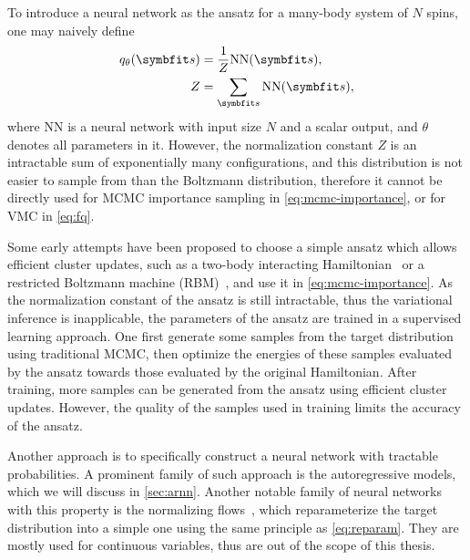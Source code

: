 To introduce a neural network as the ansatz for a many-body system of $N$ spins, one may naively define
\begin{align}
q_\theta(\vs) &= \frac{1}{Z} \text{NN}(\vs), \\
Z &= \sum_\vs \text{NN}(\vs),
\end{align}
where NN is a neural network with input size $N$ and a scalar output, and $\theta$ denotes all parameters in it. However, the normalization constant $Z$ is an intractable sum of exponentially many configurations, and this distribution is not easier to sample from than the Boltzmann distribution, therefore it cannot be directly used for MCMC importance sampling in \cref{eq:mcmc-importance}, or for VMC in \cref{eq:fq}.

Some early attempts have been proposed to choose a simple ansatz which allows efficient cluster updates, such as a two-body interacting Hamiltonian~\cite{liu2017self} or a restricted Boltzmann machine (RBM)~\cite{huang2017accelerated}, and use it in \cref{eq:mcmc-importance}. As the normalization constant of the ansatz is still intractable, thus the variational inference is inapplicable, the parameters of the ansatz are trained in a supervised learning approach. One first generate some samples from the target distribution using traditional MCMC, then optimize the energies of these samples evaluated by the ansatz towards those evaluated by the original Hamiltonian. After training, more samples can be generated from the ansatz using efficient cluster updates. However, the quality of the samples used in training limits the accuracy of the ansatz.

Another approach is to specifically construct a neural network with tractable probabilities. A prominent family of such approach is the autoregressive models, which we will discuss in \cref{sec:arnn}. Another notable family of neural networks with this property is the normalizing flows~\cite{song2017nice, muller2019neural}, which reparameterize the target distribution into a simple one using the same principle as \cref{eq:reparam}. They are mostly used for continuous variables, thus are out of the scope of this thesis.

